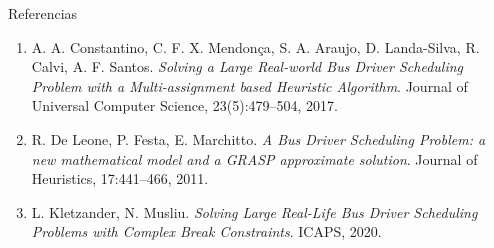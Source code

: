 \documentclass[aspectratio=169,10pt]{beamer}
\begin{document}
\begin{frame}{Referencias}
\small
\begin{enumerate}
\item[{[1]}] A. A. Constantino, C. F. X. Mendonça, S. A. Araujo, D. Landa-Silva, R. Calvi, A. F. Santos. \emph{Solving a Large Real-world Bus Driver Scheduling Problem with a Multi-assignment based Heuristic Algorithm}. Journal of Universal Computer Science, 23(5):479--504, 2017.
\item[{[2]}] R. De Leone, P. Festa, E. Marchitto. \emph{A Bus Driver Scheduling Problem: a new mathematical model and a GRASP approximate solution}. Journal of Heuristics, 17:441--466, 2011.
\item[{[3]}] L. Kletzander, N. Musliu. \emph{Solving Large Real-Life Bus Driver Scheduling Problems with Complex Break Constraints}. ICAPS, 2020.
\end{enumerate}
\end{frame}
\end{document}
